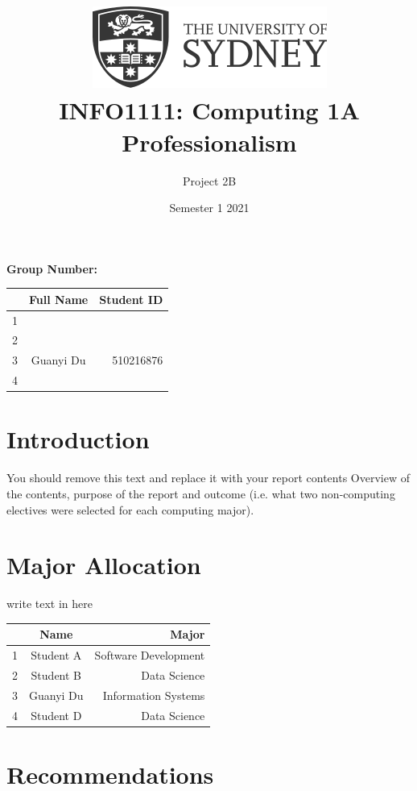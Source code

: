 \documentclass[12pt]{article}
\title{\includegraphics[scale=.5]{usydlogo.png}\linebreak \\INFO1111: Computing 1A Professionalism
}
\date{Semester 1 2021}
\author{Project 2B}
\begin{document}

\maketitle
\begin{center}
    \textbf{Group Number:}
\end{center}

\begin{center}
\begin{tabular}{|l|c|r|}
\hline
  & Full Name & Student ID \\ \hline
1 &           &            \\ \hline
2 &           &            \\ \hline
3 & Guanyi Du & 510216876  \\ \hline
4 &           &            \\ \hline
\end{tabular}
\end{center}
\thispagestyle{empty}
\newpage

\setcounter{page}{1}
\section{Introduction}
You should remove this text and replace it with your report contents
Overview of the contents, purpose of the report and outcome (i.e. what two non-computing electives were selected for each computing major).


\section{Major Allocation}
write text in here
\begin{center}
\begin{tabular}{|l|c|r|}
\hline
  & Name      & Major                \\ \hline
1 & Student A & Software Development \\ \hline
2 & Student B & Data Science        \\ \hline
3 & Guanyi Du & Information Systems  \\ \hline
4 & Student D & Data Science         \\ \hline
\end{tabular}
\end{center}

\section{Recommendations}
\end{document}
